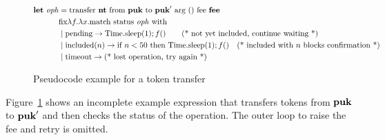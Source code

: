 \documentclass[a4paper]{llncs}
\begin{document}
\begin{figure}[tp]
  \begin{align*}
    \LET\ \mathit{oph} &=  \TRANSFER\NTEZ\PUK{\PUK'}\MTEZ \\
         & \FIX \lambda f.\lambda x. \MATCH\ \GETSTATUS{\mathit{oph}}\ \WITH \\
         & \mid \STATUSPENDING \to \text{Time.sleep(1)}; f () \textrm{\qquad(* not yet included,
           continue waiting *)} \\
         & \mid \STATUSINCLUDING (n) \to \text{if } n < 50\text{ then
           Time.sleep(1)};f ()\textrm{\quad(* included with $n$
           blocks confirmation *)}\\
         & \mid \STATUSTIMEOUT \to \textrm{(* lost operation, try
           again *)}
  \end{align*}
  \caption{Pseudocode example for a token transfer}
  \label{fig:pseudocode-example}
\end{figure}
Figure~\ref{fig:pseudocode-example} shows an incomplete example
expression that transfers tokens from $\textbf{puk}$ to $\textbf{puk}'$ and then
checks the status of the operation. The outer loop to raise the fee
and retry is omitted.
\end{document}
